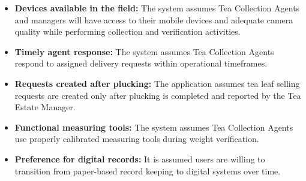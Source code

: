 \begin{itemize}
	\item \textbf{Devices available in the field:} The system assumes Tea Collection Agents and managers will have access to their mobile devices and adequate camera quality while performing collection and verification activities.
	\item \textbf{Timely agent response:} The system assumes Tea Collection Agents respond to assigned delivery requests within operational timeframes.
	\item \textbf{Requests created after plucking:} The application assumes tea leaf selling requests are created only after plucking is completed and reported by the Tea Estate Manager.
	\item \textbf{Functional measuring tools:} The system assumes Tea Collection Agents use properly calibrated measuring tools during weight verification.
	\item \textbf{Preference for digital records:} It is assumed users are willing to transition from paper-based record keeping to digital systems over time.
\end{itemize}